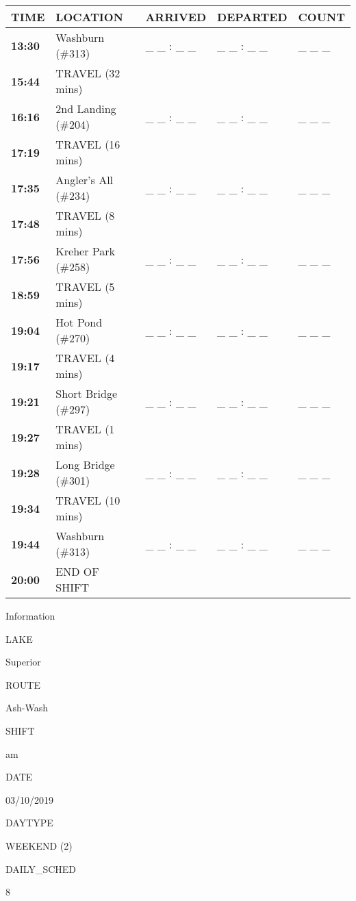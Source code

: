 \documentclass[]{article}
\begin{document}
\begin{tabular}{>{\bfseries}lllll}
\toprule
\textbf{TIME} & \textbf{LOCATION} & \textbf{ARRIVED} & \textbf{DEPARTED} & \textbf{COUNT}\\
\midrule
13:30 & Washburn (\#313) & \_ \_ : \_ \_ & \_ \_ : \_ \_ & \_ \_ \_\\
15:44 & TRAVEL (32 mins) &  &  & \\
16:16 & 2nd Landing (\#204) & \_ \_ : \_ \_ & \_ \_ : \_ \_ & \_ \_ \_\\
17:19 & TRAVEL (16 mins) &  &  & \\
17:35 & Angler's All (\#234) & \_ \_ : \_ \_ & \_ \_ : \_ \_ & \_ \_ \_\\
17:48 & TRAVEL (8 mins) &  &  & \\
17:56 & Kreher Park (\#258) & \_ \_ : \_ \_ & \_ \_ : \_ \_ & \_ \_ \_\\
18:59 & TRAVEL (5 mins) &  &  & \\
19:04 & Hot Pond (\#270) & \_ \_ : \_ \_ & \_ \_ : \_ \_ & \_ \_ \_\\
19:17 & TRAVEL (4 mins) &  &  & \\
19:21 & Short Bridge (\#297) & \_ \_ : \_ \_ & \_ \_ : \_ \_ & \_ \_ \_\\
19:27 & TRAVEL (1 mins) &  &  & \\
19:28 & Long Bridge (\#301) & \_ \_ : \_ \_ & \_ \_ : \_ \_ & \_ \_ \_\\
19:34 & TRAVEL (10 mins) &  &  & \\
19:44 & Washburn (\#313) & \_ \_ : \_ \_ & \_ \_ : \_ \_ & \_ \_ \_\\
20:00 & END OF SHIFT &  &  & \\
\bottomrule
\end{tabular}\newpage

Information

LAKE

Superior

ROUTE

Ash-Wash

SHIFT

am

DATE

03/10/2019

DAYTYPE

WEEKEND (2)

DAILY\_SCHED

8

\vspace{24pt}
\end{document}
